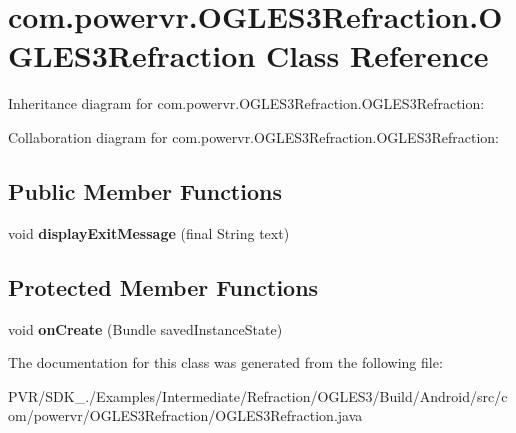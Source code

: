 \hypertarget{classcom_1_1powervr_1_1_o_g_l_e_s3_refraction_1_1_o_g_l_e_s3_refraction}{\section{com.\+powervr.\+O\+G\+L\+E\+S3\+Refraction.\+O\+G\+L\+E\+S3\+Refraction Class Reference}
\label{classcom_1_1powervr_1_1_o_g_l_e_s3_refraction_1_1_o_g_l_e_s3_refraction}
}


Inheritance diagram for com.\+powervr.\+O\+G\+L\+E\+S3\+Refraction.\+O\+G\+L\+E\+S3\+Refraction\+:


Collaboration diagram for com.\+powervr.\+O\+G\+L\+E\+S3\+Refraction.\+O\+G\+L\+E\+S3\+Refraction\+:
\subsection*{Public Member Functions}
\begin{DoxyCompactItemize}
\item 
\hypertarget{classcom_1_1powervr_1_1_o_g_l_e_s3_refraction_1_1_o_g_l_e_s3_refraction_a45b13eacc496b78ca746baf65c30ab60}{void {\bfseries display\+Exit\+Message} (final String text)}\label{classcom_1_1powervr_1_1_o_g_l_e_s3_refraction_1_1_o_g_l_e_s3_refraction_a45b13eacc496b78ca746baf65c30ab60}

\end{DoxyCompactItemize}
\subsection*{Protected Member Functions}
\begin{DoxyCompactItemize}
\item 
\hypertarget{classcom_1_1powervr_1_1_o_g_l_e_s3_refraction_1_1_o_g_l_e_s3_refraction_ae5551cab4d4ec8f9d4748c97a60bd233}{void {\bfseries on\+Create} (Bundle saved\+Instance\+State)}\label{classcom_1_1powervr_1_1_o_g_l_e_s3_refraction_1_1_o_g_l_e_s3_refraction_ae5551cab4d4ec8f9d4748c97a60bd233}

\end{DoxyCompactItemize}


The documentation for this class was generated from the following file\+:\begin{DoxyCompactItemize}
\item 
P\+V\+R/\+S\+D\+K\+\_./\+Examples/\+Intermediate/\+Refraction/\+O\+G\+L\+E\+S3/\+Build/\+Android/src/com/powervr/\+O\+G\+L\+E\+S3\+Refraction/O\+G\+L\+E\+S3\+Refraction.\+java\end{DoxyCompactItemize}
